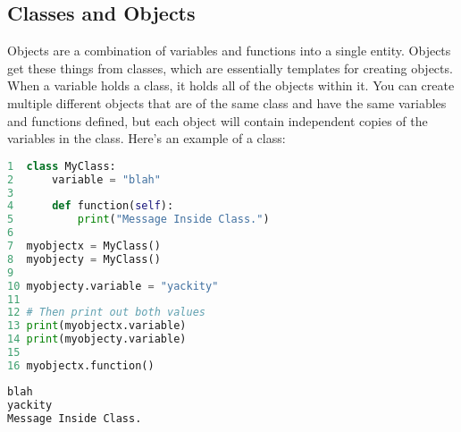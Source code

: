 \documentclass[crop=false,class=book]{standalone}
\begin{document}
\subsection{Classes and Objects}
Objects are a combination of variables and functions into a single entity. Objects get these things from classes, which are essentially templates for creating objects. When a variable holds a class, it holds all of the objects within it. You can create multiple different objects that are of the same class and have the same variables and functions defined, but each object will contain independent copies of the variables in the class. Here's an example of a class:\newline
\begin{minipage}[t]{.48\textwidth}
\begin{lstlisting}[language=python,frame=single,basicstyle=\footnotesize,frame=single,caption=input]
1  class MyClass:
2      variable = "blah"
3
4      def function(self):
5          print("Message Inside Class.")
6
7  myobjectx = MyClass()
8  myobjecty = MyClass()
9
10 myobjecty.variable = "yackity"
11
12 # Then print out both values
13 print(myobjectx.variable)
14 print(myobjecty.variable)
15
16 myobjectx.function()
\end{lstlisting}
\end{minipage}\hfill
\begin{minipage}[t]{.48\textwidth}
\begin{lstlisting}[language=python,frame=single,basicstyle=\footnotesize,frame=single,caption=output]
blah
yackity
Message Inside Class.
\end{lstlisting}
\end{minipage}
\newpage
\end{document}

